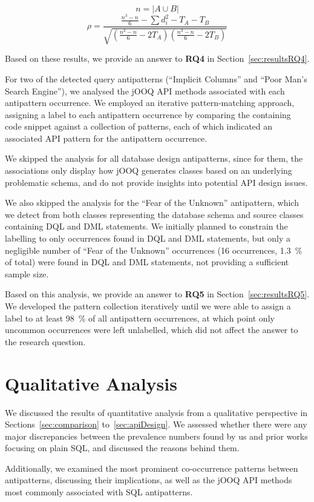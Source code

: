 \begin{equation}
n = |A \cup B|
\end{equation}
\begin{equation}
\rho = \frac{\frac{n^3 - n}{6} - \sum d_i^2 - T_A - T_B}{\sqrt{\left(\frac{n^3 - n}{6} - 2T_A\right)\left(\frac{n^3 - n}{6} - 2T_B\right)}}
\end{equation}

Based on these results, we provide an answer to \textbf{RQ4} in Section~\ref{sec:resultsRQ4}.

For two of the detected query antipatterns (“Implicit Columns” and “Poor Man's Search Engine”), we analysed the jOOQ API methods associated with each antipattern occurrence. We employed an iterative pattern-matching approach, assigning a label to each antipattern occurrence by comparing the containing code snippet against a collection of patterns, each of which indicated an associated API pattern for the antipattern occurrence.

We skipped the analysis for all database design antipatterns, since for them, the associations only display how jOOQ generates classes based on an underlying problematic schema, and do not provide insights into potential API design issues.

We also skipped the analysis for the “Fear of the Unknown” antipattern, which we detect from both classes representing the database schema and source classes containing DQL and DML statements. We initially planned to constrain the labelling to only occurrences found in DQL and DML statements, but only a negligible number of “Fear of the Unknown” occurrences (\num{16} occurrences, \qty{1.3}{\percent} of total) were found in DQL and DML statements, not providing a sufficient sample size.

Based on this analysis, we provide an answer to \textbf{RQ5} in Section~\ref{sec:resultsRQ5}. We developed the pattern collection iteratively until we were able to assign a label to at least \qty{98}{\percent} of all antipattern occurrences, at which point only uncommon occurrences were left unlabelled, which did not affect the answer to the research question.

\section{Qualitative Analysis}

We discussed the results of quantitative analysis from a qualitative perspective in Sections~\ref{sec:comparison} to~\ref{sec:apiDesign}. We assessed whether there were any major discrepancies between the prevalence numbers found by us and prior works focusing on plain SQL, and discussed the reasons behind them.

Additionally, we examined the most prominent co-occurrence patterns between antipatterns, discussing their implications, as well as the jOOQ API methods most commonly associated with SQL antipatterns.